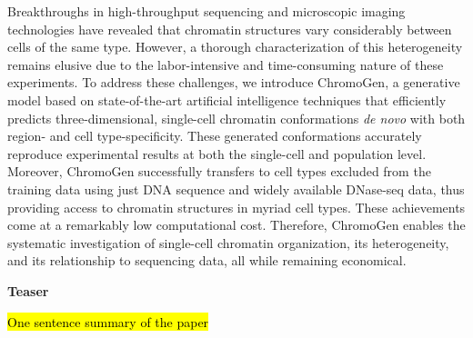 \documentclass[12pt,letterpaper]{article}
\newcommand{\markblankline}{\newline\mbox{}\newline} %
\begin{document}
\begin{flushleft}
Breakthroughs in high-throughput sequencing and microscopic imaging technologies have revealed that chromatin structures vary considerably between cells of the same type. However, a thorough characterization of this heterogeneity remains elusive due to the labor-intensive and time-consuming nature of these experiments. To address these challenges, we introduce ChromoGen, a generative model based on state-of-the-art artificial intelligence techniques that efficiently predicts three-dimensional, single-cell chromatin conformations \emph{de novo} with both region- and cell type-specificity. These generated conformations accurately reproduce experimental results at both the single-cell and population level. Moreover, ChromoGen successfully transfers to cell types excluded from the training data using just DNA sequence and widely available DNase-seq data, thus providing access to chromatin structures in myriad cell types. These achievements come at a remarkably low computational cost. Therefore, ChromoGen enables the systematic investigation of single-cell chromatin organization, its heterogeneity, and its relationship to sequencing data, all while remaining economical. 
\mbox{}\newline
\vspace{-.5em}
\begin{adjustwidth}{-.5in}{}
\textbf{Teaser}
\end{adjustwidth}
\vspace{-.5em}
\hl{One sentence summary of the paper}
\mbox{}\newline%
\end{flushleft}


\end{document}
